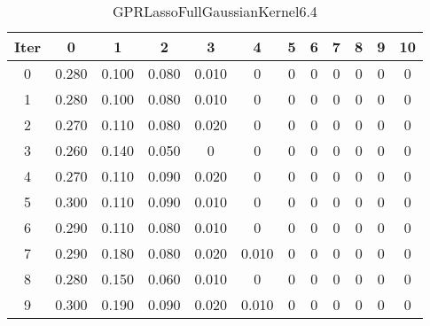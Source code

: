 \begin{table}
	\begin{center}
		\begin{tabular}{|c|c|c|c|c|c|c|c|c|c|c|c|}
			\hline
			Iter & 0 & 1 & 2 & 3 & 4 & 5 & 6 & 7 & 8 & 9 & 10 \\
			\hline
			0 & 0.280 & 0.100 & 0.080 & 0.010 & 0 & 0 & 0 & 0 & 0 & 0 & 0 \\
			\hline
			1 & 0.280 & 0.100 & 0.080 & 0.010 & 0 & 0 & 0 & 0 & 0 & 0 & 0 \\
			\hline
			2 & 0.270 & 0.110 & 0.080 & 0.020 & 0 & 0 & 0 & 0 & 0 & 0 & 0 \\
			\hline
			3 & 0.260 & 0.140 & 0.050 & 0 & 0 & 0 & 0 & 0 & 0 & 0 & 0 \\
			\hline
			4 & 0.270 & 0.110 & 0.090 & 0.020 & 0 & 0 & 0 & 0 & 0 & 0 & 0 \\
			\hline
			5 & 0.300 & 0.110 & 0.090 & 0.010 & 0 & 0 & 0 & 0 & 0 & 0 & 0 \\
			\hline
			6 & 0.290 & 0.110 & 0.080 & 0.010 & 0 & 0 & 0 & 0 & 0 & 0 & 0 \\
			\hline
			7 & 0.290 & 0.180 & 0.080 & 0.020 & 0.010 & 0 & 0 & 0 & 0 & 0 & 0 \\
			\hline
			8 & 0.280 & 0.150 & 0.060 & 0.010 & 0 & 0 & 0 & 0 & 0 & 0 & 0 \\
			\hline
			9 & 0.300 & 0.190 & 0.090 & 0.020 & 0.010 & 0 & 0 & 0 & 0 & 0 & 0 \\
			\hline
		\end{tabular}
	\end{center}
	\caption{GPRLassoFullGaussianKernel6.4}
\end{table}